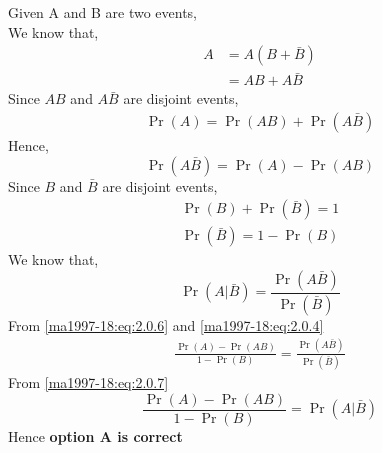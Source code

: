 
Given A and B are two events,\\
We know that,
\begin{align}
    A&=A(B+\bar{B})\\
    &=AB+A\bar{B}
\end{align}
Since $AB$ and $A\bar{B}$ are disjoint events,
\begin{align}
    \Pr{(A)}=\Pr{(AB)}+\Pr{(A\bar{B})}
\end{align}
Hence,
\begin{equation}
    \Pr(A\bar{B})=\Pr{(A)}-\Pr{(AB)}\label{ma1997-18:eq:2.0.4}
\end{equation}
Since $B$ and $\bar{B}$ are disjoint events,
\begin{align}
    \Pr{(B)}+\Pr{(\bar{B})}=1\\
    \Pr{(\bar{B})}=1-\Pr{(B)}\label{ma1997-18:eq:2.0.6}
\end{align}
We know that,
\begin{equation}
\Pr{(A|\bar{B})}=\frac{\Pr{(A\bar{B})}}{\Pr{(\bar{B})}} \label{ma1997-18:eq:2.0.7}    
\end{equation}
From \eqref{ma1997-18:eq:2.0.6} and \eqref{ma1997-18:eq:2.0.4}
\begin{align}
    \frac{\Pr(A)-\Pr(AB)}{1-\Pr{(B)}}=\frac{\Pr{(A\bar{B})}}{\Pr{(\bar{B})}}
\end{align}
From \eqref{ma1997-18:eq:2.0.7}
\begin{equation}
    \frac{\Pr(A)-\Pr(AB)}{1-\Pr{(B)}}=\Pr{(A|\bar{B})}
\end{equation}
Hence \textbf{option A is correct}